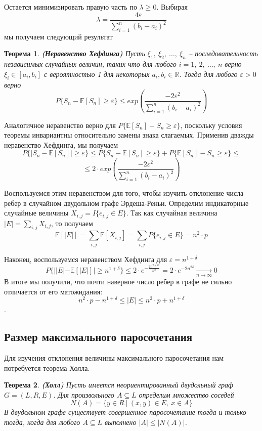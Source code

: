 \documentclass[a4paper]{article}
\newtheorem{mtheorem}{Теорема}[section]
\begin{document}
Остается минимизировать правую часть по $\lambda \geq 0$. Выбирая $$\lambda = \frac{4\varepsilon}{\sum\limits_{i=1}^n(b_i-a_i)^2}$$ 
мы получаем следующий результат 
\begin{mtheorem}\emph{\textbf{(Неравенство Хефдинга)}}
    Пусть $\xi_1,\ \xi_2,\ \dots,\ \xi_n$ -- последовательность независимых случайных величин, таких что 
для любого $i = 1,\ 2,\ \ldots,\ n$ верно $\xi_i \in [a_i, b_i]$ с вероятностью 1 для некоторых 
$a_i, b_i \in \mathbb{R}$. Тогда для любого $\varepsilon > 0$ верно $$P\{S_n - \mathbb{E}[S_n]\geq 
\varepsilon\} \leq exp\left(\frac{-2\varepsilon^2}{\sum\limits_{i=1}^n(b_i - a_i)^2}\right)$$
\end{mtheorem}

Аналогичное неравенство верно для $P\{\mathbb{E}[S_n] - S_n\geq \varepsilon\}$, поскольку условия теоремы 
инвариантны относительно замены знака слагаемых. Применив дважды неравенство Хефдинга, мы получаем 
$$P\{|S_n - \mathbb{E}[S_n]|\geq \varepsilon\} \leq P\{S_n - \mathbb{E}[S_n]\geq \varepsilon\} + 
P\{\mathbb{E}[S_n] - S_n\geq \varepsilon\} \leq $$ $$\leq 2\cdot exp\left(\frac{-2\varepsilon^2}{\sum\limits_{i=1}^n(b_i - a_i)^2}\right)$$

Воспользуемся этим неравенством для того, чтобы изучить отклонение числа ребер в случайном двудольном 
графе Эрдеша-Реньи. Определим индикаторные случайные величины $X_{i, j} = I\{e_{i,j}\in E\}$. Так как случайная 
величина $|E| = \sum\limits_{i,j}X_{i,j}$, то получаем $$\mathbb{E}[|E|] = \sum\limits_{i,j}\mathbb{E}[X_{i,j}] = 
\sum\limits_{i,j}P\{e_{i,j}\in E\} = n^2\cdot p$$

Наконец, воспользуемся неравенством Хефдинга для $\varepsilon = n^{1+\delta}$ $$ P\{||E| - \mathbb{E}[|E|]| \geq
n^{1+\delta}\} \leq 2\cdot e^{-\frac{2n^{2+2\delta}}{n^2}} = 2\cdot e^{-2n^{2\delta}} \xrightarrow[n \to \infty]{} 0 $$ 
В итоге мы получили, что почти наверное число ребер в графе не сильно отличается от его матожидания: 
$$n^2\cdot p - n^{1+\delta} \leq |E| \leq n^2\cdot p + n^{1+\delta}$$.


\subsection{Размер максимального паросочетания}

Для изучения отклонения величины максимального паросочетания нам потребуется теорема Холла.
\begin{mtheorem}\emph{\textbf{(Холл)}}
    Пусть имеется неориентированный двудольный граф $G = (L, R, E)$. Для произвольного $A \subseteq L$ 
    определим множество соседей  $$N(A) = \{y\in R\ |\ (x, y) \in E,\ x\in A\}$$ В двудольном графе существует 
    совершенное паросочетание тогда и только тогда, когда для любого $A \subseteq L$ выполнено $|A| \leq |N(A)|$.
\end{mtheorem}
\end{document}
